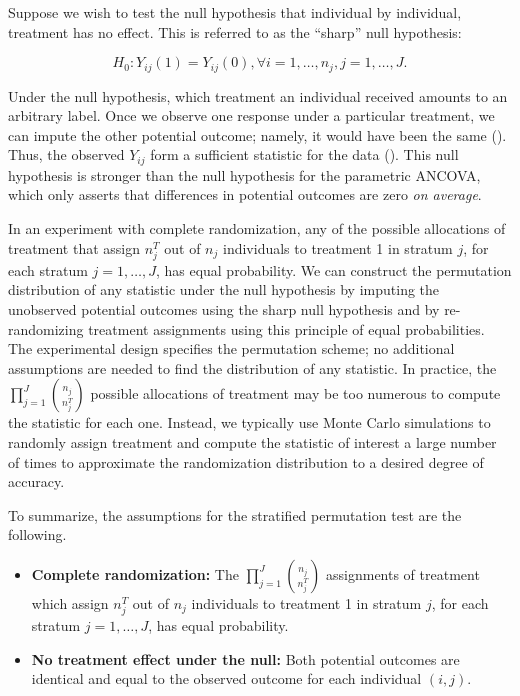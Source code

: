 \documentclass[12pt]{article}
\begin{document}
Suppose we wish to test the null hypothesis that individual by individual, treatment has no effect.
This is referred to as the ``sharp'' null hypothesis:

\begin{equation}\label{eqn:sharp_null}
H_0: Y_{ij}(1) = Y_{ij}(0), \forall i = 1, \dots, n_j, j = 1,\dots, J.
\end{equation}

Under the null hypothesis, which treatment an individual received amounts to an arbitrary label.
Once we observe one response under a particular treatment, we can impute the other potential outcome; namely, it would have been the same  (\cite{rosenbaum_covariance_2002}).
Thus, the observed $Y_{ij}$ form a sufficient statistic for the data (\cite{pesarin_permutation_2010}).
This null hypothesis is stronger than the null hypothesis for the parametric ANCOVA, which only asserts that differences in potential outcomes are zero \textit{on average}.

In an experiment with complete randomization, any of the possible allocations of treatment that assign $n_j^T$ out of $n_j$ individuals to treatment 1 in stratum $j$, for each stratum $j=1,\dots,J$, has equal probability.
We can construct the permutation distribution of any statistic under the null hypothesis by imputing the unobserved potential outcomes using the sharp null hypothesis and by re-randomizing treatment assignments using this principle of equal probabilities.
The experimental design specifies the permutation scheme; no additional assumptions are needed to find the distribution of any statistic.
In practice, the $\prod_{j=1}^J {n_j \choose n_j^T}$ possible allocations of treatment may be too numerous to compute the statistic for each one.
Instead, we typically use Monte Carlo simulations to randomly assign treatment and compute the statistic of interest a large number of times to approximate the randomization distribution to a desired degree of accuracy.

To summarize, the assumptions for the stratified permutation test are the following.
\begin{itemize}
\item \textbf{Complete randomization:} The $\prod_{j=1}^J {n_j \choose n_j^T}$ assignments of treatment which assign $n_j^T$ out of $n_j$ individuals to treatment 1 in stratum $j$, for each stratum $j=1,\dots,J$, has equal probability.
\item \textbf{No treatment effect under the null:} Both potential outcomes are identical and equal to the observed outcome for each individual $(i, j)$.
\end{itemize}
\end{document}
